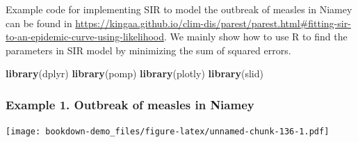 \documentclass[]{book}
\newenvironment{Shaded}{\begin{snugshade}}{\end{snugshade}}
\newcommand{\KeywordTok}[1]{\textcolor[rgb]{0.13,0.29,0.53}{\textbf{#1}}}
\newcommand{\DataTypeTok}[1]{\textcolor[rgb]{0.13,0.29,0.53}{#1}}
\newcommand{\StringTok}[1]{\textcolor[rgb]{0.31,0.60,0.02}{#1}}
\newcommand{\OperatorTok}[1]{\textcolor[rgb]{0.81,0.36,0.00}{\textbf{#1}}}
\newcommand{\NormalTok}[1]{#1}
\begin{document}
Example code for implementing SIR to model the outbreak of measles in
Niamey can be found in
\url{https://kingaa.github.io/clim-dis/parest/parest.html\#fitting-sir-to-an-epidemic-curve-using-likelihood}.
We mainly show how to use R to find the parameters in SIR model by
minimizing the sum of squared errors.

\begin{Shaded}
\begin{Highlighting}[]
\KeywordTok{library}\NormalTok{(dplyr)}
\KeywordTok{library}\NormalTok{(pomp)}
\KeywordTok{library}\NormalTok{(plotly)}
\KeywordTok{library}\NormalTok{(slid)}
\end{Highlighting}
\end{Shaded}

\subsubsection{Example 1. Outbreak of measles in
Niamey}\label{example-1.-outbreak-of-measles-in-niamey}

\begin{Shaded}
\end{Shaded}

\texttt{[image: bookdown-demo\_files/figure-latex/unnamed-chunk-136-1.pdf]}
\end{document}
